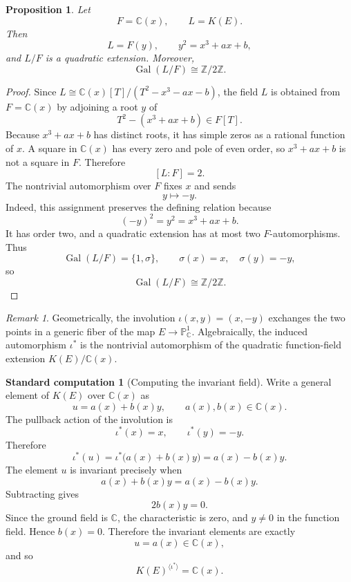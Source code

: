\documentclass[11pt]{article}
\newtheorem{proposition}[theorem]{Proposition}
\theoremstyle{definition}
\newtheorem{calculation}[theorem]{Standard computation}
\theoremstyle{remark}
\newtheorem{remark}[theorem]{Remark}
\newcommand{\C}{\mathbb{C}}
\newcommand{\Pj}{\mathbb{P}}
\newcommand{\Z}{\mathbb{Z}}
\newcommand{\K}{K}
\newcommand{\Gal}{\operatorname{Gal}}
\begin{document}
\begin{proposition}
Let
\[
  F=\C(x),
  \qquad
  L=\K(E).
\]
Then
\[
  L=F(y),\qquad y^2=x^3+ax+b,
\]
and \(L/F\) is a quadratic extension.  Moreover,
\[
  \Gal(L/F)\cong \Z/2\Z.
\]
\end{proposition}

\begin{proof}
Since \(L\cong \C(x)[T]/(T^2-x^3-ax-b)\), the field \(L\) is obtained from
\(F=\C(x)\) by adjoining a root \(y\) of
\[
  T^2-(x^3+ax+b)\in F[T].
\]
Because \(x^3+ax+b\) has distinct roots, it has simple zeros as a rational
function of \(x\).  A square in \(\C(x)\) has every zero and pole of even
order, so \(x^3+ax+b\) is not a square in \(F\).  Therefore
\[
  [L:F]=2.
\]
The nontrivial automorphism over \(F\) fixes \(x\) and sends
\[
  y\longmapsto -y.
\]
Indeed, this assignment preserves the defining relation because
\[
  (-y)^2=y^2=x^3+ax+b.
\]
It has order two, and a quadratic extension has at most two \(F\)-automorphisms.
Thus
\[
  \Gal(L/F)=\{1,\sigma\},
  \qquad
  \sigma(x)=x,\quad \sigma(y)=-y,
\]
so
\[
  \Gal(L/F)\cong \Z/2\Z.
\]
\end{proof}

\begin{remark}
Geometrically, the involution \(\iota(x,y)=(x,-y)\) exchanges the two points in
a generic fiber of the map \(E\to \Pj^1_{\C}\).  Algebraically, the induced
automorphism \(\iota^*\) is the nontrivial automorphism of the quadratic
function-field extension \(\K(E)/\C(x)\).
\end{remark}

\begin{calculation}[Computing the invariant field]
Write a general element of \(\K(E)\) over \(\C(x)\) as
\[
  u=a(x)+b(x)y,
  \qquad a(x),b(x)\in \C(x).
\]
The pullback action of the involution is
\[
  \iota^*(x)=x,\qquad \iota^*(y)=-y.
\]
Therefore
\[
  \iota^*(u)
  =
  \iota^*\bigl(a(x)+b(x)y\bigr)
  =
  a(x)-b(x)y.
\]
The element \(u\) is invariant precisely when
\[
  a(x)+b(x)y=a(x)-b(x)y.
\]
Subtracting gives
\[
  2b(x)y=0.
\]
Since the ground field is \(\C\), the characteristic is zero, and \(y\neq 0\)
in the function field.  Hence \(b(x)=0\).  Therefore the invariant elements
are exactly
\[
  u=a(x)\in \C(x),
\]
and so
\[
  \K(E)^{\langle \iota^*\rangle}=\C(x).
\]
\end{calculation}
\end{document}
